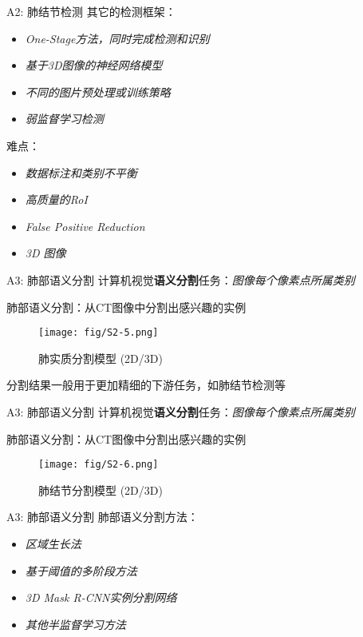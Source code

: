 \documentclass[10pt]{beamer}
\begin{document}
\begin{frame}{A2: 肺结节检测}
  其它的检测框架：
  \begin{itemize}
    \item \textit{One-Stage方法，同时完成检测和识别}
    \item \textit{基于3D图像的神经网络模型}
    \item \textit{不同的图片预处理或训练策略}
    \item \textit{弱监督学习检测}
  \end{itemize}

  难点：
  \begin{itemize}
    \item \textit{数据标注和类别不平衡}
    \item \textit{高质量的RoI}
    \item \textit{False Positive Reduction}
    \item \textit{3D 图像}
  \end{itemize}
\end{frame}

\begin{frame}{A3: 肺部语义分割}
  计算机视觉\textbf{语义分割}任务：\textit{图像每个像素点所属类别}

  肺部语义分割：从CT图像中分割出感兴趣的实例
   
  \begin{figure}[htbp]
    \centering
    \texttt{[image: fig/S2-5.png]}
    \caption{肺实质分割模型 (2D/3D)}
  \end{figure}

  分割结果一般用于更加精细的下游任务，如肺结节检测等

\end{frame}

\begin{frame}{A3: 肺部语义分割}
  计算机视觉\textbf{语义分割}任务：\textit{图像每个像素点所属类别}

  肺部语义分割：从CT图像中分割出感兴趣的实例

  \begin{figure}[htbp]
    \centering
    \texttt{[image: fig/S2-6.png]}
    \caption{肺结节分割模型 (2D/3D)}
  \end{figure}
\end{frame}

\begin{frame}{A3: 肺部语义分割}
  肺部语义分割方法：
  \begin{itemize}
    \item \textit{区域生长法}
    \item \textit{基于阈值的多阶段方法}
    \item \textit{3D Mask R-CNN实例分割网络}
    \item \textit{其他半监督学习方法}
  \end{itemize}
\end{frame}
\end{document}
